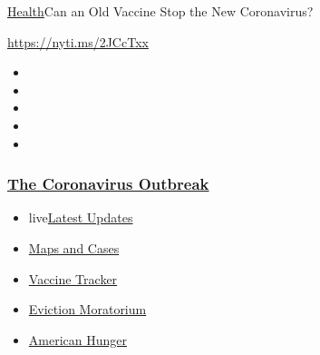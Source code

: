 \href{/section/health}{Health}\textbar{}Can an Old Vaccine Stop the New
Coronavirus?

\url{https://nyti.ms/2JCcTxx}

\begin{itemize}
\item
\item
\item
\item
\item
\end{itemize}

\hypertarget{the-coronavirus-outbreak}{%
\subsubsection{\texorpdfstring{\href{https://www.nytimes3xbfgragh.onion/news-event/coronavirus?name=styln-coronavirus-national\&region=TOP_BANNER\&block=storyline_menu_recirc\&action=click\&pgtype=Article\&impression_id=d75aa960-efba-11ea-9838-db61c3659d7e\&variant=undefined}{The
Coronavirus
Outbreak}}{The Coronavirus Outbreak}}\label{the-coronavirus-outbreak}}

\begin{itemize}
\tightlist
\item
  live\href{https://www.nytimes3xbfgragh.onion/2020/09/05/world/coronavirus-covid.html?name=styln-coronavirus-national\&region=TOP_BANNER\&block=storyline_menu_recirc\&action=click\&pgtype=Article\&impression_id=d75ad070-efba-11ea-9838-db61c3659d7e\&variant=undefined}{Latest
  Updates}
\item
  \href{https://www.nytimes3xbfgragh.onion/interactive/2020/us/coronavirus-us-cases.html?name=styln-coronavirus-national\&region=TOP_BANNER\&block=storyline_menu_recirc\&action=click\&pgtype=Article\&impression_id=d75ad071-efba-11ea-9838-db61c3659d7e\&variant=undefined}{Maps
  and Cases}
\item
  \href{https://www.nytimes3xbfgragh.onion/interactive/2020/science/coronavirus-vaccine-tracker.html?name=styln-coronavirus-national\&region=TOP_BANNER\&block=storyline_menu_recirc\&action=click\&pgtype=Article\&impression_id=d75ad072-efba-11ea-9838-db61c3659d7e\&variant=undefined}{Vaccine
  Tracker}
\item
  \href{https://www.nytimes3xbfgragh.onion/2020/09/02/your-money/eviction-moratorium-covid.html?name=styln-coronavirus-national\&region=TOP_BANNER\&block=storyline_menu_recirc\&action=click\&pgtype=Article\&impression_id=d75ad073-efba-11ea-9838-db61c3659d7e\&variant=undefined}{Eviction
  Moratorium}
\item
  \href{https://www.nytimes3xbfgragh.onion/interactive/2020/09/02/magazine/food-insecurity-hunger-us.html?name=styln-coronavirus-national\&region=TOP_BANNER\&block=storyline_menu_recirc\&action=click\&pgtype=Article\&impression_id=d75ad074-efba-11ea-9838-db61c3659d7e\&variant=undefined}{American
  Hunger}
\end{itemize}


